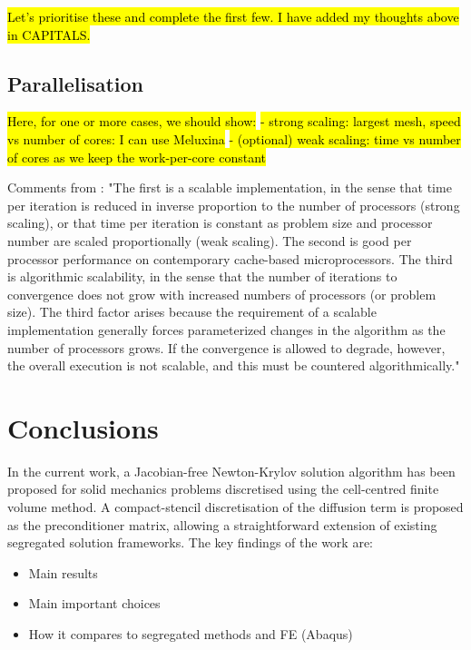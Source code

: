 \documentclass[sn-mathphys,Numbered]{sn-jnl}%
\begin{document}
\hl{Let's prioritise these and complete the first few. I have added my thoughts above in CAPITALS.}



\subsection{Parallelisation}

\hl{Here, for one or more cases, we should show:}
\hl{- strong scaling: largest mesh, speed vs number of cores: I can use Meluxina}
\hl{- (optional) weak scaling: time vs number of cores as we keep the work-per-core constant}


Comments from \cite{Knoll2004}:
"The first is a scalable implementation, in the sense that time per iteration is reduced in inverse proportion to the number of processors (strong scaling), or that time per iteration is constant as problem size and processor number are scaled proportionally (weak scaling). The second is good per processor performance on contemporary cache-based microprocessors. The third is algorithmic scalability, in the sense that the number of iterations to convergence does not grow with increased numbers of processors (or problem size). The third factor arises because the requirement of a scalable implementation generally forces parameterized changes in the algorithm as the number of processors grows. If the convergence is allowed to degrade, however, the overall execution is not scalable, and this must be countered algorithmically."


\section{Conclusions} \label{sec:conclusion}
In the current work, a Jacobian-free Newton-Krylov solution algorithm has been proposed for solid mechanics problems discretised using the cell-centred finite volume method.
A compact-stencil discretisation of the diffusion term is proposed as the preconditioner matrix, allowing a straightforward extension of existing segregated solution frameworks.
The key findings of the work are:
\begin{itemize}
	\item Main results
	\item Main important choices
	\item How it compares to segregated methods and FE (Abaqus)
\end{itemize}
\end{document}
